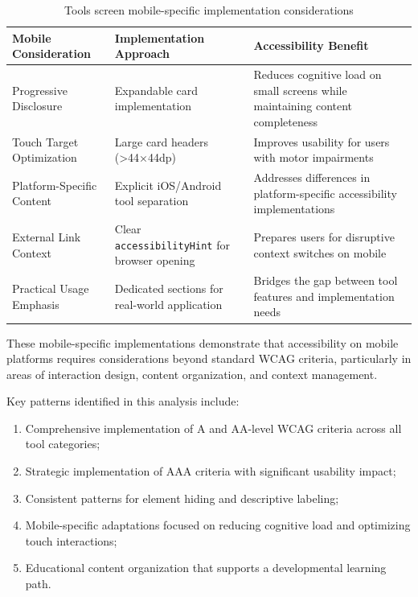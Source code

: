 \begin{table}[ht]
\caption{Tools screen mobile-specific implementation considerations}
\label{tab:tools_mobile_considerations_summary}
\centering
\begin{tabular}[c]{|C{3.8cm}|C{5.5cm}|C{4.5cm}|}
\hline
\textbf{Mobile Consideration} & \textbf{Implementation Approach} & \textbf{Accessibility Benefit} \\
\hline
Progressive Disclosure & Expandable card implementation & Reduces cognitive load on small screens while maintaining content completeness \\
\hline
Touch Target Optimization & Large card headers (>44×44dp) & Improves usability for users with motor impairments \\
\hline
Platform-Specific Content & Explicit iOS/Android tool separation & Addresses differences in platform-specific accessibility implementations \\
\hline
External Link Context & Clear \texttt{accessibilityHint} for browser opening & Prepares users for disruptive context switches on mobile \\
\hline
Practical Usage Emphasis & Dedicated sections for real-world application & Bridges the gap between tool features and implementation needs \\
\hline
\end{tabular}
\end{table}
\FloatBarrier

These mobile-specific implementations demonstrate that accessibility on mobile platforms requires considerations beyond standard WCAG criteria, particularly in areas of interaction design, content organization, and context management.

Key patterns identified in this analysis include:

\begin{enumerate}
    \item Comprehensive implementation of A and AA-level WCAG criteria across all tool categories;
    
    \item Strategic implementation of AAA criteria with significant usability impact;
    
    \item Consistent patterns for element hiding and descriptive labeling;
    
    \item Mobile-specific adaptations focused on reducing cognitive load and optimizing touch interactions;
    
    \item Educational content organization that supports a developmental learning path.
\end{enumerate}

